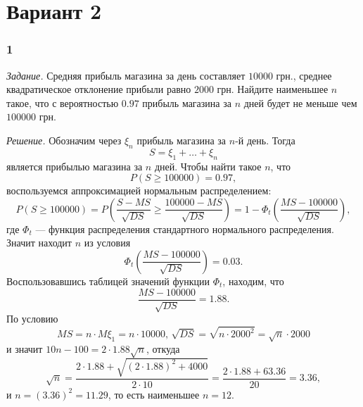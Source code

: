\section*{Вариант 2}

\subsubsection*{1}

\textit{Задание.}
Средняя прибыль магазина за день составляет $10000$ грн.,
среднее квадратическое отклонение прибыли равно $2000$ грн.
Найдите наименьшее $n$ такое,
что с вероятностью $0.97$ прибыль магазина за $n$ дней будет не меньше чем $100000$ грн.

\textit{Решение.} Обозначим через $ \xi_n$ прибыль магазина за $n$-й день.
Тогда
$$S =
  \xi_1 + \dotsc + \xi_n$$
является прибылью магазина за $n$ дней.
Чтобы найти такое $n$, что
$$P \left( S \geq 100000 \right) =
  0.97,$$
воспользуемся аппроксимацией нормальным распределением:
$$P \left( S \geq 100000 \right) =
  P \left( \frac{S - MS}{ \sqrt{DS}} \geq \frac{100000 - MS}{ \sqrt{DS}} \right) =
  1 - \Phi_t \left( \frac{MS - 100000}{ \sqrt{DS}} \right),$$
где $ \Phi_t$ --- функция распределения стандартного нормального распределения.
Значит находит $n$ из условия
$$ \Phi_t \left( \frac{MS - 100000}{ \sqrt{DS}} \right) =
  0.03.$$
Воспользовавшись таблицей значений функции $ \Phi_t$, находим, что
$$ \frac{MS - 100000}{ \sqrt{DS}} =
  1.88.$$
По условию
$$MS = n \cdot M \xi_1 = n \cdot 10000, \,
  \sqrt{DS} = \sqrt{n \cdot 2000^2} = \sqrt{n} \cdot 2000$$
и значит $10n - 100 = 2 \cdot 1.88 \sqrt{n}$, откуда
$$ \sqrt{n} =
  \frac{2 \cdot 1.88 + \sqrt{ \left( 2 \cdot 1.88 \right)^2 + 4000}}{2 \cdot 10} =
  \frac{2 \cdot 1.88 + 63.36}{20} =
  3.36,$$
и $n = \left( 3.36 \right)^2 = 11.29$, то есть наименьшее $n = 12$.
